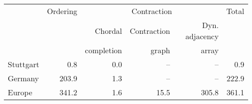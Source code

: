 \begin{tabular}{lrrrrr}
\toprule
{} &  Ordering & \multicolumn{3}{c}{Contraction} & Total \\ \cmidrule(lr){3-5}
{} &  {} &  Chordal &  Contraction & Dyn. adjacency & \\
{} &  {} &  completion & graph \cite{DibbeltSW16} & array \cite{DibbeltSW16} & \\
\midrule
Stuttgart &                          0.8 &                          0.0 &          -- &           -- &             0.9 \\
Germany   &                        203.9 &                          1.3 &          -- &           -- &           222.9 \\
Europe    &                        341.2 &                          1.6 &        15.5 &        305.8 &           361.1 \\
\bottomrule
\end{tabular}

